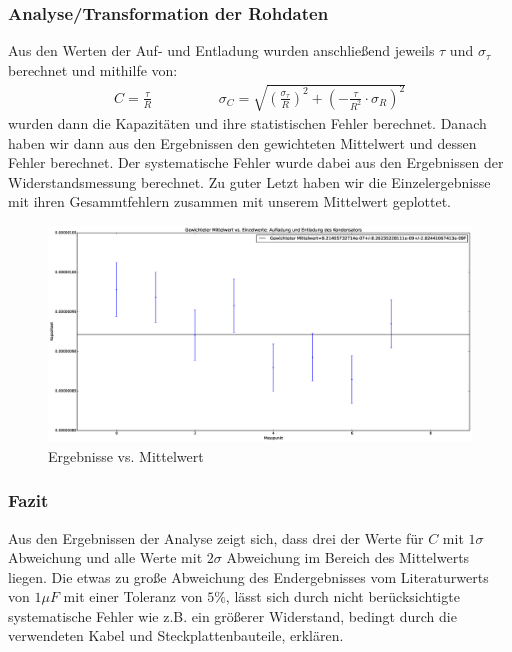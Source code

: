 \documentclass[12pt,a4paper]{article}
\begin{document}
\subsubsection{Analyse/Transformation der Rohdaten}
Aus den Werten der Auf- und Entladung wurden anschließend jeweils $\tau$ und $\sigma_{\tau}$ berechnet und mithilfe von:
\begin{align*}
C=\frac{\tau}{R} \hspace{2cm} \sigma_C=\sqrt{(\frac{\sigma_{\tau}}{R})^2+(-\frac{\tau}{R^2}\cdot \sigma_R)^2}
\end{align*}
wurden dann die Kapazitäten und ihre statistischen Fehler berechnet.
Danach haben wir dann aus den Ergebnissen den gewichteten Mittelwert und dessen Fehler berechnet. Der systematische Fehler wurde dabei aus den Ergebnissen der Widerstandsmessung berechnet.
Zu guter Letzt haben wir die Einzelergebnisse mit ihren Gesammtfehlern zusammen mit unserem Mittelwert geplottet.
\begin{figure}[hbtp]
\centering
\includegraphics[scale=0.3]{auf-entladung.eps}
\caption{Ergebnisse vs. Mittelwert}
\end{figure}
\subsubsection{Fazit}
Aus den Ergebnissen der Analyse zeigt sich, dass drei der Werte für $C$ mit $1\sigma$ Abweichung und alle Werte mit $2\sigma$ Abweichung im Bereich des Mittelwerts liegen. Die etwas zu große Abweichung des Endergebnisses vom Literaturwerts von $1\mu F$ mit einer Toleranz von $5 \%$, lässt sich durch nicht berücksichtigte systematische Fehler wie z.B. ein größerer Widerstand, bedingt durch die verwendeten Kabel und Steckplattenbauteile, erklären.
\end{document}
